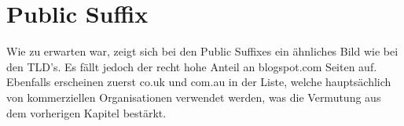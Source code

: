 \documentclass[a4paper,12pt,titlepage=false]{scrreprt}
\begin{document}
\section{Public Suffix}
\vspace{.1cm}

\vspace{.1cm}

Wie zu erwarten war, zeigt sich bei den Public Suffixes ein ähnliches Bild wie bei den TLD's. Es fällt jedoch der recht hohe Anteil an blogspot.com Seiten auf. Ebenfalls erscheinen zuerst co.uk und com.au in der Liste, welche hauptsächlich von kommerziellen Organisationen verwendet werden, was die Vermutung aus dem vorherigen Kapitel bestärkt.
\end{document}
